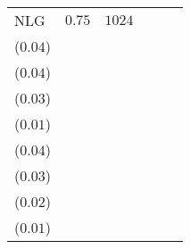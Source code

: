 \begin{table}[t]
\begin{tabular}{lrrrrr}
NLG & \(0.75\) & \(1024\) & \longcell{\(0.50\)\\{\tiny(\(0.04\))}} & \longcell{\(0.46\)\\{\tiny(\(0.04\))}} & \longcell{\(0.35\)\\{\tiny(\(0.03\))}} & \longcell{\(0.15\)\\{\tiny(\(0.01\))}} & \longcell{\(0.28\)\\{\tiny(\(0.04\))}} & \longcell{\(0.24\)\\{\tiny(\(0.03\))}} & \longcell{\(0.17\)\\{\tiny(\(0.02\))}} & \longcell{\(0.07\)\\{\tiny(\(0.01\))}} \\
\bottomrule
\end{tabular}
\end{table}
